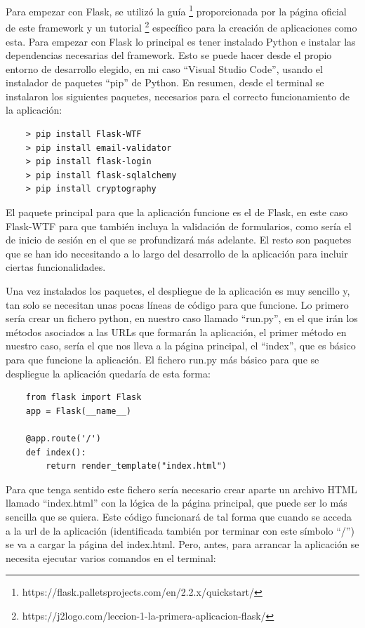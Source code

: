 Para empezar con Flask, se utilizó la guía \footnote{https://flask.palletsprojects.com/en/2.2.x/quickstart/} proporcionada por la página oficial de este framework y un tutorial \footnote{https://j2logo.com/leccion-1-la-primera-aplicacion-flask/} específico para la creación de aplicaciones como esta. Para empezar con Flask lo principal es tener instalado Python e instalar las dependencias necesarias del framework. Esto se puede hacer desde el propio entorno de desarrollo elegido, en mi caso ``Visual Studio Code'', usando el instalador de paquetes ``pip'' de Python. En resumen, desde el terminal se instalaron los siguientes paquetes, necesarios para el correcto funcionamiento de la aplicación:

\begin{verbatim}
	> pip install Flask-WTF
	> pip install email-validator
	> pip install flask-login
	> pip install flask-sqlalchemy
	> pip install cryptography
\end{verbatim}

El paquete principal para que la aplicación funcione es el de Flask, en este caso Flask-WTF para que también incluya la validación de formularios, como sería el de inicio de sesión en el que se profundizará más adelante. El resto son paquetes que se han ido necesitando a lo largo del desarrollo de la aplicación para incluir ciertas funcionalidades. 

Una vez instalados los paquetes, el despliegue de la aplicación es muy sencillo y, tan solo se necesitan unas pocas líneas de código para que funcione. Lo primero sería crear un fichero python, en nuestro caso llamado ``run.py'', en el que irán los métodos asociados a las URLs que formarán la aplicación, el primer método en nuestro caso, sería el que nos lleva a la página principal, el ``index'', que es básico para que funcione la aplicación. El fichero run.py más básico para que se despliegue la aplicación quedaría de esta forma:

\begin{verbatim}
	from flask import Flask
	app = Flask(__name__)
	
	@app.route('/')
	def index():
		return render_template("index.html")
\end{verbatim}

Para que tenga sentido este fichero sería necesario crear aparte un archivo HTML llamado ``index.html'' con la lógica de la página principal, que puede ser lo más sencilla que se quiera. Este código funcionará de tal forma que cuando se acceda a la url de la aplicación (identificada también por terminar con este símbolo ``/'') se va a cargar la página del index.html. Pero, antes, para arrancar la aplicación se necesita ejecutar varios comandos en el terminal:

